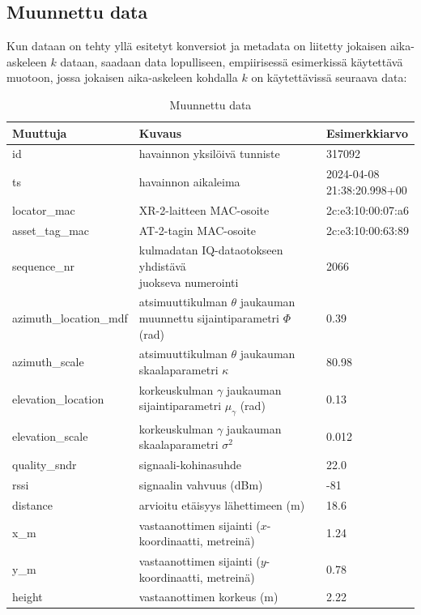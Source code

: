 \documentclass[
  12pt,
  a4paper, twoside]{book}
\begin{document}
\subsection{Muunnettu data} \label{muunnettu-data-luku}

Kun dataan on tehty yllä esitetyt konversiot ja metadata on liitetty jokaisen aika-askeleen \(k\) dataan, saadaan data lopulliseen, empiirisessä esimerkissä käytettävä muotoon, jossa jokaisen aika-askeleen kohdalla \(k\) on käytettävissä seuraava data:

\def\arraystretch{1.25} 
\begin{table}[H]
\centering
\begin{tabular}{|l|l|l|}
\hline
Muuttuja & Kuvaus & Esimerkkiarvo\\
\hline
id & havainnon yksilöivä tunniste & 317092 \\
ts & havainnon aikaleima & \makecell[l]{2024-04-08 \\ 21:38:20.998+00}\\
locator\_mac & XR-2-laitteen MAC-osoite & 2c:e3:10:00:07:a6
\\
asset\_tag\_mac & AT-2-tagin MAC-osoite & 2c:e3:10:00:63:89\\
sequence\_nr & \makecell[l]{kulmadatan IQ-dataotokseen yhdistävä \\ juokseva numerointi} & 2066\\
azimuth\_location\_mdf & \makecell[l]{atsimuuttikulman $\theta$ \\ jaukauman muunnettu sijaintiparametri \\ $\Phi$ (rad)} & 0.39
\\
azimuth\_scale & \makecell[l]{atsimuuttikulman $\theta$ \\ jaukauman skaalaparametri $\kappa$} & 80.98
\\
elevation\_location & \makecell[l]{korkeuskulman $\gamma$ \\ jaukauman sijaintiparametri $\mu_{\gamma}$ (rad)} & 0.13
\\
elevation\_scale & \makecell[l]{korkeuskulman $\gamma$ \\ jaukauman skaalaparametri $\sigma^2$} & 0.012
\\
quality\_sndr & signaali-kohinasuhde & 22.0 \\
rssi & signaalin vahvuus (dBm) & -81\\
distance & arvioitu etäisyys lähettimeen (m) & 18.6\\
x\_m & \makecell[l]{vastaanottimen sijainti \\ ($x$-koordinaatti, metreinä)} & 1.24\\
y\_m & \makecell[l]{vastaanottimen sijainti \\ ($y$-koordinaatti, metreinä)} & 0.78\\
height & vastaanottimen korkeus (m) & 2.22 \\
\hline
\end{tabular}
\caption{Muunnettu data}
\label{tab:muunnettu-data}
\end{table}
\end{document}
